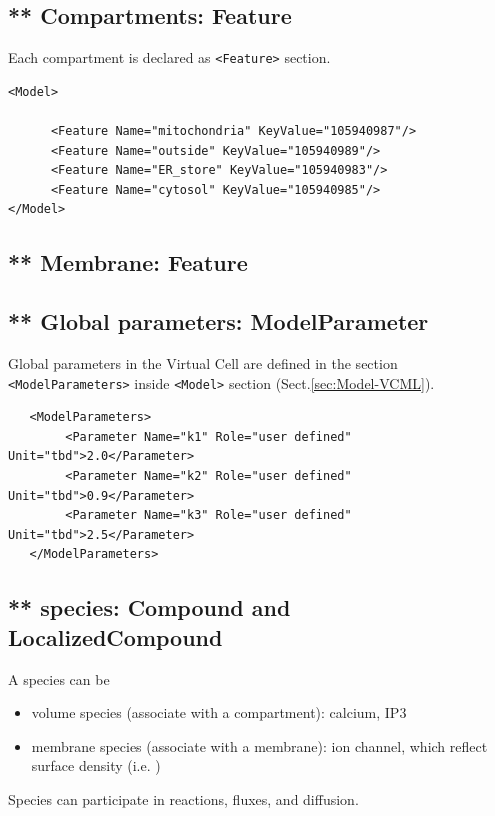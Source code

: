 \subsection{** Compartments: Feature}
\label{sec:Compartment-VCML}

Each compartment is declared as \verb!<Feature>! section.

\begin{verbatim}
<Model>

      <Feature Name="mitochondria" KeyValue="105940987"/>
      <Feature Name="outside" KeyValue="105940989"/>
      <Feature Name="ER_store" KeyValue="105940983"/>
      <Feature Name="cytosol" KeyValue="105940985"/>
</Model>
\end{verbatim}

\subsection{** Membrane: Feature}
\label{sec:membrane-VCML}


\subsection{** Global parameters: ModelParameter}

Global parameters in the Virtual Cell are defined in the section
\verb!<ModelParameters>! inside \verb!<Model>! section
(Sect.\ref{sec:Model-VCML}).

\begin{verbatim}
   <ModelParameters>
        <Parameter Name="k1" Role="user defined" Unit="tbd">2.0</Parameter>
        <Parameter Name="k2" Role="user defined" Unit="tbd">0.9</Parameter>
        <Parameter Name="k3" Role="user defined" Unit="tbd">2.5</Parameter>
   </ModelParameters>
\end{verbatim}

\subsection{** species: Compound and LocalizedCompound}
\label{sec:Species-VCML}

A species can be 
\begin{itemize}
  \item volume species (associate with a compartment): calcium, IP3
  \item membrane species (associate with a membrane): ion channel, which reflect
  surface density (i.e. )
  
  
\end{itemize}
Species can participate in reactions, fluxes, and diffusion. 

